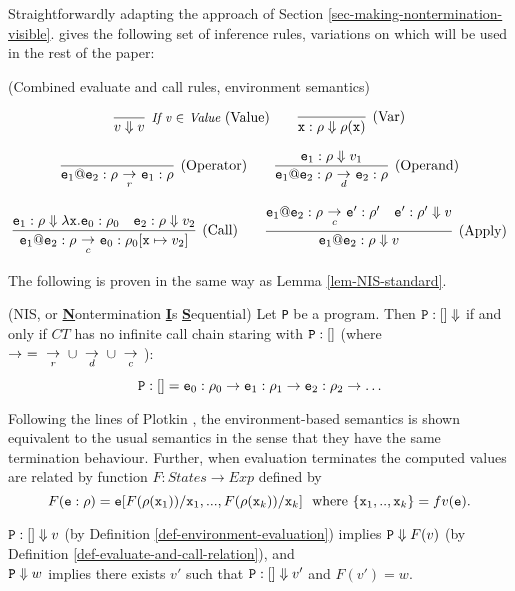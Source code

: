 \documentclass{LMCS}
\newcommand{\vair}{\relax}
\newcommand{\bdfn}{\begin{defi}}
\newcommand{\edfn}{\end{defi}}
\newcommand{\blem}{\begin{lem}}
\newcommand{\elem}{\end{lem}}
\theoremstyle{definition}\newtheorem{env}[thm]{Environment}
\newcommand{\tosub}[1]{\raisebox{-6.0pt}{$\ \stackrel{\textstyle\to}{\vrule height4.5 pt width0 pt
    depth2.5 pt \smash{\scriptstyle#1}}\ $}}
\begin{document}
Straightforwardly adapting the approach of 
Section \ref{sec-making-nontermination-visible}.
gives  the following  set of inference rules, variations on which will be used in the rest of the paper:

\bdfn \label{def-evaluate-and-call-relation-environment}
(Combined evaluate and call rules, environment semantics)
\bigskip

$$
\infer[\mbox{{\it {\small If v $\in$ Value}}\ }(\textnormal{Value})]{v\Downarrow v}{}
\qquad
\infer[(\textnormal{Var})]{{\tt x} :\rho\Downarrow\rho({\tt x})}{}
$$


$$
\infer[(\textnormal{Operator})]{{\tt e}_1{\tt@e}_2:\rho\tosub{r}{\tt e}_1:\rho}{}
\qquad
\infer[(\textnormal{Operand})]{{\tt e}_1{\tt@e}_2:\rho\tosub{d}{\tt e}_2:\rho}{{\tt e}_1:\rho\Downarrow v_1}
$$

$$
\infer[(\textnormal{Call})]{{\tt e}_1{\tt@e}_2:\rho\tosub{c}{\tt e}_0:\rho_0[{\tt x}\mapsto v_2]}
{{\tt e}_1:\rho\Downarrow \lambda{\tt x.e}_0:\rho_0
 & {\tt e}_2:\rho\Downarrow v_2}
\qquad
\infer[(\textnormal{Apply})]{{\tt e}_1{\tt@e}_2:\rho\Downarrow v}{{\tt e}_1{\tt@e}_2:\rho\tosub{c}{\tt e}':\rho' &
{\tt e}':\rho'\Downarrow v}
$$
\edfn
\bigskip

\noindent The following is proven in the same way as Lemma  \ref{lem-NIS-standard}.

\blem \label{lem-NIS-environment} {\rm (}NIS, or {\bf\underline N}ontermination 
{\bf\underline I}s 
{\bf\underline S}equential{\rm )} 
Let {\tt P} be a program. 
Then ${\tt P}:[]\Downarrow$  if and only if $CT$ has no infinite call chain staring with ${\tt P}:[]$
(where $\to\ =\tosub{r}\cup\tosub{d}\cup\tosub{c}$):
$$
{\tt P}:[] = {\tt e}_0:\rho_0\to{\tt e}_1:\rho_1\to{\tt e}_2:\rho_2\to \ldots 
$$
\elem
\medskip

Following the lines of Plotkin \cite{plotkin}, the environment-based semantics is 
shown equivalent to the usual semantics in 
the sense that they have the same termination behaviour. Further, 
when evaluation terminates the computed values are related by function
$F:States\to Exp$ defined by
$$F({\tt e}:\rho) = {\tt e}[F(\rho({\tt x}_1))/ {\tt x}_1,...,F(\rho({\tt x}_k))/ {\tt x}_k]
\mbox{\ \ where  }
\{{\tt x}_1,.., {\tt x}_k\} = 
fv({\tt e}).$$

\vair
\blem\label{lem-equivalent-semantics} 
${\tt P}:[] \Downarrow v$ (by Definition \ref{def-environment-evaluation}) 
implies
${\tt P}\Downarrow F(v)$  (by Definition \ref{def-evaluate-and-call-relation}), and\\
${\tt P}\Downarrow w$ implies there exists $v'$ such that  ${\tt P}:[] \Downarrow v'$ and $F(v')=w$.
\elem 
\end{document}
